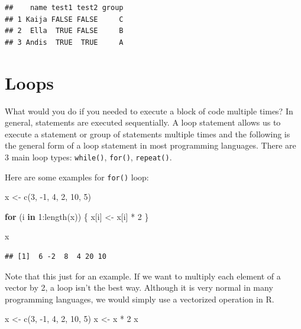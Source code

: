 \documentclass[
]{book}
\newenvironment{Shaded}{\begin{snugshade}}{\end{snugshade}}
\newcommand{\ControlFlowTok}[1]{\textcolor[rgb]{0.13,0.29,0.53}{\textbf{#1}}}
\newcommand{\DecValTok}[1]{\textcolor[rgb]{0.00,0.00,0.81}{#1}}
\newcommand{\FunctionTok}[1]{\textcolor[rgb]{0.00,0.00,0.00}{#1}}
\newcommand{\NormalTok}[1]{#1}
\newcommand{\OtherTok}[1]{\textcolor[rgb]{0.56,0.35,0.01}{#1}}
\newcommand{\SpecialCharTok}[1]{\textcolor[rgb]{0.00,0.00,0.00}{#1}}
\begin{document}
\begin{verbatim}
##    name test1 test2 group
## 1 Kaija FALSE FALSE     C
## 2  Ella  TRUE FALSE     B
## 3 Andis  TRUE  TRUE     A
\end{verbatim}

\hypertarget{loops}{%
\section{Loops}\label{loops}}

What would you do if you needed to execute a block of code multiple times? In general, statements are executed sequentially. A loop statement allows us to execute a statement or group of statements multiple times and the following is the general form of a loop statement in most programming languages. There are 3 main loop types: \texttt{while()}, \texttt{for()}, \texttt{repeat()}.

Here are some examples for \texttt{for()} loop:

\begin{Shaded}
\begin{Highlighting}[]
\NormalTok{x }\OtherTok{\textless{}{-}} \FunctionTok{c}\NormalTok{(}\DecValTok{3}\NormalTok{, }\SpecialCharTok{{-}}\DecValTok{1}\NormalTok{, }\DecValTok{4}\NormalTok{, }\DecValTok{2}\NormalTok{, }\DecValTok{10}\NormalTok{, }\DecValTok{5}\NormalTok{)}

\ControlFlowTok{for}\NormalTok{ (i }\ControlFlowTok{in} \DecValTok{1}\SpecialCharTok{:}\FunctionTok{length}\NormalTok{(x)) \{}
\NormalTok{  x[i] }\OtherTok{\textless{}{-}}\NormalTok{ x[i] }\SpecialCharTok{*} \DecValTok{2}
\NormalTok{\}}

\NormalTok{x}
\end{Highlighting}
\end{Shaded}

\begin{verbatim}
## [1]  6 -2  8  4 20 10
\end{verbatim}

Note that this just for an example. If we want to multiply each element of a vector by 2, a loop isn't the best way. Although it is very normal in many programming languages, we would simply use a vectorized operation in R.

\begin{Shaded}
\begin{Highlighting}[]
\NormalTok{x }\OtherTok{\textless{}{-}} \FunctionTok{c}\NormalTok{(}\DecValTok{3}\NormalTok{, }\SpecialCharTok{{-}}\DecValTok{1}\NormalTok{, }\DecValTok{4}\NormalTok{, }\DecValTok{2}\NormalTok{, }\DecValTok{10}\NormalTok{, }\DecValTok{5}\NormalTok{)}
\NormalTok{x }\OtherTok{\textless{}{-}}\NormalTok{ x }\SpecialCharTok{*} \DecValTok{2}
\NormalTok{x}
\end{Highlighting}
\end{Shaded}
\end{document}
